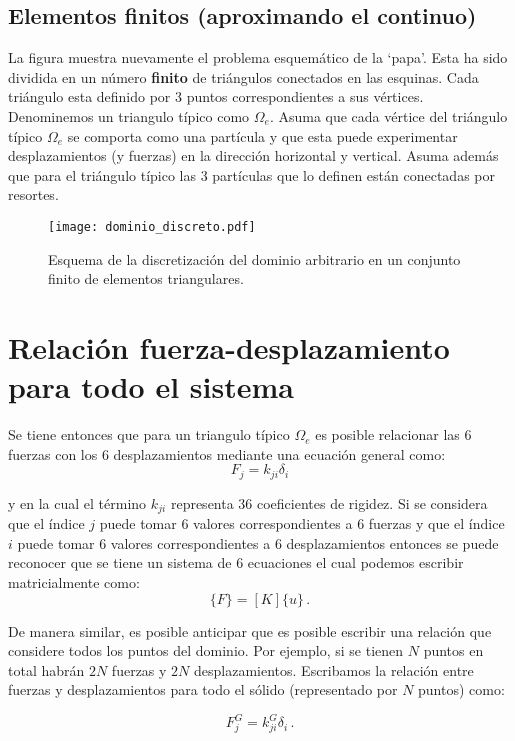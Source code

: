 \subsection{Elementos finitos (aproximando el continuo)}
La figura muestra nuevamente el problema esquemático de la `papa'. Esta ha sido 
dividida en un número \textbf{finito} de triángulos conectados en las esquinas. 
Cada triángulo esta definido por 3 puntos correspondientes a sus vértices. 
Denominemos un triangulo típico como $\Omega_e$. Asuma que cada vértice del 
triángulo típico $\Omega_e$ se comporta como una partícula y que esta puede 
experimentar desplazamientos (y fuerzas) en la dirección horizontal y vertical. 
Asuma además que para el triángulo típico las 3 partículas que lo definen están 
conectadas por resortes.
\begin{figure}[H]
\centering
\texttt{[image: dominio\_discreto.pdf]}
\caption{Esquema de la discretización del dominio arbitrario en un conjunto 
finito de elementos triangulares.}
\label{fig:meshed}
\end{figure}

\section{Relación fuerza-desplazamiento para todo el sistema}
Se tiene entonces que para un triangulo típico $\Omega_e$ es posible relacionar 
las 6 fuerzas con los 6 desplazamientos mediante una ecuación general como:
\begin{equation}
F_j = k_ {ji} \delta_i
\end{equation}

y en la cual el término $k_{ji}$ representa 36 coeficientes de rigidez. Si se 
considera que el índice $j$ puede tomar 6 valores correspondientes a 6 fuerzas 
y que el índice $i$ puede tomar 6 valores correspondientes a 6 desplazamientos 
entonces se puede reconocer que se tiene un sistema de 6 ecuaciones el cual 
podemos escribir matricialmente como:
\begin{equation}
\{ F \}=[ K ] \{ u \}\, .
\end{equation}

De manera similar, es posible anticipar que es posible escribir una relación 
que considere todos los puntos del dominio. Por ejemplo, si se tienen $N$ 
puntos en total habrán $2N$ fuerzas y $2N$ desplazamientos. Escribamos la 
relación entre fuerzas y desplazamientos para todo el sólido (representado por 
$N$ puntos) como:

\begin{equation}
F_j^G = k_ {ji}^G \delta_i\, .
\end{equation}

